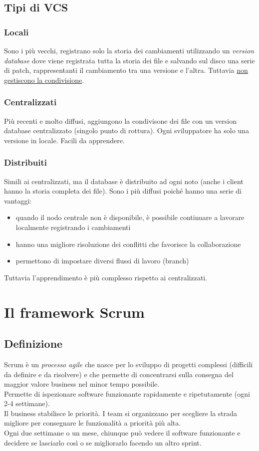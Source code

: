 \documentclass[10pt, a4paper]{article}
\begin{document}
\subsection{Tipi di VCS}
\subsubsection*{Locali}
Sono i più vecchi, registrano solo la storia dei cambiamenti utilizzando un \textit{version database} dove viene registrata tutta la storia dei file e salvando sul disco una serie di patch, rappresentanti il cambiamento tra una versione e l'altra. Tuttavia \underline{non gestiscono la condivisione}.

\subsubsection*{Centralizzati}
Più recenti e molto diffusi, aggiungono la condivisone dei file con un version database centralizzato (singolo punto di rottura). Ogni sviluppatore ha solo una versione in locale. Facili da apprendere.

\subsubsection*{Distribuiti}
Simili ai centralizzati, ma il database è distribuito ad ogni noto (anche i client hanno la storia completa dei file). Sono i più diffusi poiché hanno una serie di vantaggi:
\begin{itemize}
\item quando il nodo centrale non è disponibile, è possibile continuare a lavorare localmente registrando i cambiamenti
\item hanno una migliore risoluzione dei conflitti che favorisce la collaborazione
\item permettono di impostare diversi flussi di lavoro (branch)
\end{itemize}
Tuttavia l'apprendimento è più complesso rispetto ai centralizzati.

\section{Il framework Scrum}
\subsection{Definizione}
Scrum è un \textit{processo agile} che nasce per lo sviluppo di progetti complessi (difficili da definire e da risolvere) e che permette di concentrarsi sulla consegna del maggior valore business nel minor tempo possibile.\\
Permette di ispezionare software funzionante rapidamente e ripetutamente (ogni 2-4 settimane).\\
Il business stabilisce le priorità. I team si organizzano per scegliere la strada migliore per consegnare le funzionalità a priorità più alta.\\
Ogni due settimane o un mese, chiunque può vedere il software funzionante e decidere se lasciarlo così o se migliorarlo facendo un altro sprint.
\end{document}
